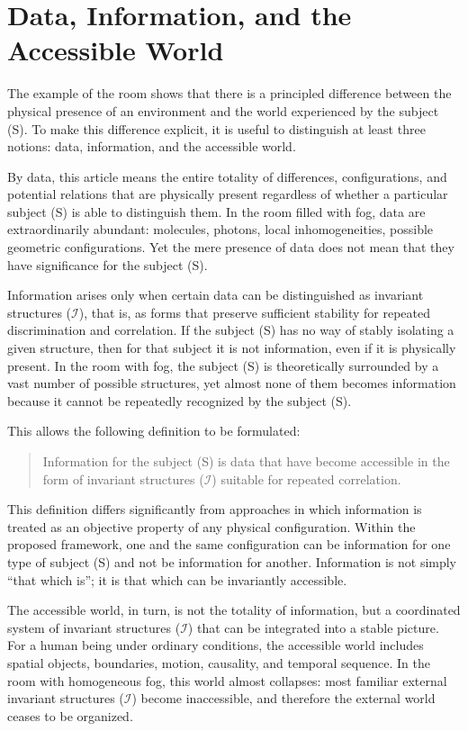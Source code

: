 \documentclass[aps,prd,onecolumn,nofootinbib,superscriptaddress]{revtex4-2} %
\begin{document}
    \section{Data, Information, and the Accessible World}
    The example of the room shows that there is a principled difference between the physical presence of an environment and the world experienced by the subject (S). To make this difference explicit, it is useful to distinguish at least three notions: data, information, and the accessible world.

    By data, this article means the entire totality of differences, configurations, and potential relations that are physically present regardless of whether a particular subject (S) is able to distinguish them. In the room filled with fog, data are extraordinarily abundant: molecules, photons, local inhomogeneities, possible geometric configurations. Yet the mere presence of data does not mean that they have significance for the subject (S).

    Information arises only when certain data can be distinguished as invariant structures ($\mathcal{I}$), that is, as forms that preserve sufficient stability for repeated discrimination and correlation. If the subject (S) has no way of stably isolating a given structure, then for that subject it is not information, even if it is physically present. In the room with fog, the subject (S) is theoretically surrounded by a vast number of possible structures, yet almost none of them becomes information because it cannot be repeatedly recognized by the subject (S).

    This allows the following definition to be formulated:

    \begin{quote}
        Information for the subject (S) is data that have become accessible in the form of invariant structures ($\mathcal{I}$) suitable for repeated correlation.
    \end{quote}

    This definition differs significantly from approaches in which information is treated as an objective property of any physical configuration. Within the proposed framework, one and the same configuration can be information for one type of subject (S) and not be information for another. Information is not simply “that which is”; it is that which can be invariantly accessible.

    The accessible world, in turn, is not the totality of information, but a coordinated system of invariant structures ($\mathcal{I}$) that can be integrated into a stable picture. For a human being under ordinary conditions, the accessible world includes spatial objects, boundaries, motion, causality, and temporal sequence. In the room with homogeneous fog, this world almost collapses: most familiar external invariant structures ($\mathcal{I}$) become inaccessible, and therefore the external world ceases to be organized.
\end{document}
